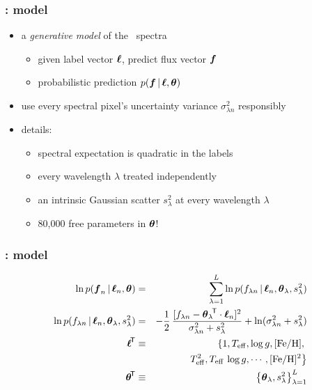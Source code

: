 \documentclass[pdftex]{beamer}
\newcommand{\teff}{T_{\mathrm{eff}}}
\newcommand{\logg}{\log g}
\newcommand{\feh}{[\mathrm{Fe / H}]}
\begin{document}
\begin{frame}
  \frametitle{\tc: model}
  \begin{itemize}
  \item a \emph{generative model} of the \apogee\ spectra
    \begin{itemize}
    \item given label vector $\boldsymbol{\ell}$, predict flux vector $\boldsymbol{f}$
    \item probabilistic prediction $p(\boldsymbol{f}\,|\,\boldsymbol{\ell},\boldsymbol{\theta})$
    \end{itemize}
  \item use every spectral pixel's uncertainty variance $\sigma^2_{\lambda n}$ responsibly
  \item details:
    \begin{itemize}
    \item spectral expectation is quadratic in the labels
    \item every wavelength $\lambda$ treated independently
    \item an intrinsic Gaussian scatter $s^2_\lambda$ at every wavelength $\lambda$
    \item 80,000 free parameters in $\boldsymbol{\theta}$!
    \end{itemize}
  \end{itemize}
\end{frame}

\begin{frame}
  \frametitle{\tc: model}
{\footnotesize
  \begin{eqnarray}
    \ln p(\fluxes_n\given\labels_n,\pars) &=& \sum_{\lambda=1}^L \ln p(\flux_{\lambda n}\given\labels_n,\pars_\lambda,s^2_\lambda)
    \nonumber \\
    \ln p(\flux_{\lambda n}\given\labels_n,\pars_\lambda,s^2_\lambda) &=& -\frac{1}{2}\,\frac{[f_{\lambda n} - \transpose{\pars_\lambda}\cdot\labels_n]^2}{\sigma^2_{\lambda n} + s^2_\lambda} + \ln (\sigma^2_{\lambda n} + s^2_\lambda)
    \nonumber \\
    \transpose{\labels} &\equiv& \left\{1, \teff, \logg, \feh,\right.
    \nonumber \\
                        & & \left.\teff^2, \teff\,\logg, \cdots, \feh^2\right\}
    \nonumber \\
    \transpose{\pars} &\equiv& \left\{\pars_\lambda, s^2_\lambda\right\}_{\lambda=1}^L
    \nonumber
  \end{eqnarray}
}
\end{frame}
\end{document}
